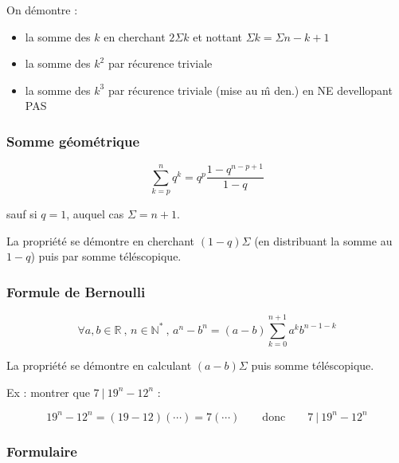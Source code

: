 \documentclass{report}
\newcommand{\R}{\mathbb{R}}
\newcommand{\N}{\mathbb{N}}
\begin{document}
        On démontre :
        \begin{itemize}
          \item la somme des $k$ en cherchant $2\Sigma k$ et nottant $\Sigma k = \Sigma n-k+1$
          \item la somme des $k^2$ par récurence triviale
          \item la somme des $k^3$ par récurence triviale (mise au \^m den.) en NE devellopant PAS
        \end{itemize}

      \subsubsection{Somme géométrique}

        \[\sum_{k=p}^{n} q^k = q^p\frac{1-q^{n-p+1}}{1-q}\]

        sauf si $q=1$, auquel cas $\Sigma = n+1$.

        La propriété se démontre en cherchant $(1-q)\Sigma$ (en distribuant la somme au $1-q$) puis par somme téléscopique.

      \subsubsection{Formule de Bernoulli}

        \[\forall a,b\in\R ~,\, n\in\N^*~,\, \boxed{a^n-b^n = (a-b)\sum_{k=0}^{n+1} a^kb^{n-1-k}}\]

        \vspace{1em}

        La propriété se démontre en calculant $(a-b)\Sigma$ puis somme téléscopique.

        Ex : montrer que $7 ~|~ 19^n-12^n$ : 
        
        \[19^n-12^n = (19-12)(\cdots) = 7(\cdots) \quad\quad \text{donc} \quad\quad 7 ~|~ 19^n-12^n\]
        
      \subsubsection{Formulaire}
\end{document}
